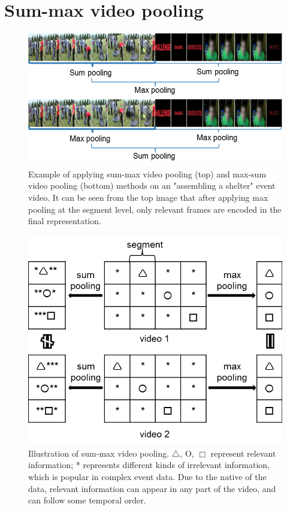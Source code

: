 \section{Sum-max video pooling} 
\label{sec:summax}
\begin{figure}
	\centering
	\includegraphics[width=1\textwidth]{summax_maxsum.png}
	\caption{Example of applying sum-max video pooling (top) and max-sum video pooling (bottom) methods on an "assembling a shelter" event video. It can be seen from the top image that after applying max pooling at the segment level, only relevant frames are encoded in the final representation.}
	\label{f_sum_max3}
\end{figure}
\begin{figure}[!htb]
	\centering
	\includegraphics[width=1\textwidth]{sum_max.png}
	\caption{Illustration of sum-max video pooling. $\triangle$, O, $\Box$ represent relevant information; * represents different kinds of irrelevant information, which is popular in complex event data. Due to the native of the data, relevant information can appear in any part of the video, and can follow some temporal order. }
	\label{f_sum_max}
\end{figure}
